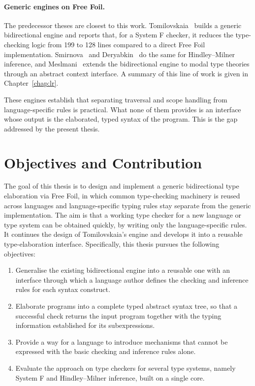 \paragraph{Generic engines on Free Foil.} The predecessor theses are closest to this work. Tomilovskaia~\cite{tomilovskaia2025bidir} builds a generic bidirectional engine and reports that, for a System F checker, it reduces the type-checking logic from 199 to 128 lines compared to a direct Free Foil implementation. Smirnova~\cite{smirnova2025thesis} and Deryabkin~\cite{deryabkin2025hmlevels} do the same for Hindley--Milner inference, and Meslmani~\cite{meslmani2026thesis} extends the bidirectional engine to modal type theories through an abstract context interface. A summary of this line of work is given in Chapter~\ref{chap:lr}.

These engines establish that separating traversal and scope handling from language-specific rules is practical. What none of them provides is an interface whose output is the elaborated, typed syntax of the program. This is the gap addressed by the present thesis.

\section{Objectives and Contribution}
\label{sec:intro-objectives}

The goal of this thesis is to design and implement a generic bidirectional type elaboration via Free Foil, in which common type-checking machinery is reused across languages and language-specific typing rules stay separate from the generic implementation. The aim is that a working type checker for a new language or type system can be obtained quickly, by writing only the language-specific rules. It continues the design of Tomilovskaia's engine and develops it into a reusable type-elaboration interface. Specifically, this thesis pursues the following objectives:
\begin{enumerate}
    \item Generalise the existing bidirectional engine into a reusable one with an interface through which a language author defines the checking and inference rules for each syntax construct.
    \item Elaborate programs into a complete typed abstract syntax tree, so that a successful check returns the input program together with the typing information established for its subexpressions.
    \item Provide a way for a language to introduce mechanisms that cannot be expressed with the basic checking and inference rules alone.
    \item Evaluate the approach on type checkers for several type systems, namely System F and Hindley--Milner inference, built on a single core.
\end{enumerate}

